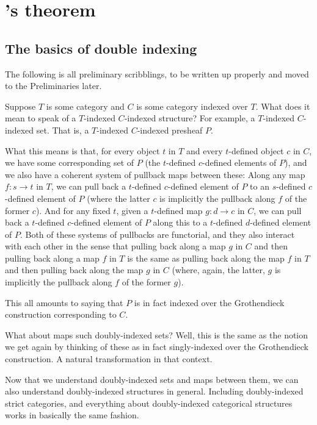 \section{\Loeb's theorem}

\subsection{The basics of double indexing}
\begin{TODOblock}
The following is all preliminary scribblings, to be written up properly and moved to the Preliminaries later.
\end{TODOblock}

Suppose $T$ is some category and $C$ is some category indexed over $T$. What does it mean to speak of a $T$-indexed $C$-indexed structure? For example, a $T$-indexed $C$-indexed set. That is, a $T$-indexed $C$-indexed presheaf $P$.

What this means is that, for every object $t$ in $T$ and every $t$-defined object $c$ in $C$, we have some corresponding set of $P$ (the $t$-defined $c$-defined elements of $P$), and we also have a coherent system of pullback maps between these: Along any map $f : s \to t$ in $T$, we can pull back a $t$-defined $c$-defined element of $P$ to an $s$-defined $c$-defined element of $P$ (where the latter $c$ is implicitly the pullback along $f$ of the former $c$). And for any fixed $t$, given a $t$-defined map $g : d \to c$ in $C$, we can pull back a $t$-defined $c$-defined element of $P$ along this to a $t$-defined $d$-defined element of $P$. Both of these systems of pullbacks are functorial, and they also interact with each other  in the sense that pulling back along a map $g$ in $C$ and then pulling back along a map $f$ in $T$ is the same as pulling back along the map $f$ in $T$ and then pulling back along the map $g$ in $C$ (where, again, the latter, $g$ is implicitly the pullback along $f$ of the former $g$).

This all amounts to saying that $P$ is in fact indexed over the Grothendieck construction corresponding to $C$.

What about maps such doubly-indexed sets? Well, this is the same as the notion we get again by thinking of these as in fact singly-indexed over the Grothendieck construction. A natural transformation in that context.

Now that we understand doubly-indexed sets and maps between them, we can also understand doubly-indexed structures in general. Including doubly-indexed strict categories, and everything about doubly-indexed categorical structures works in basically the same fashion.

